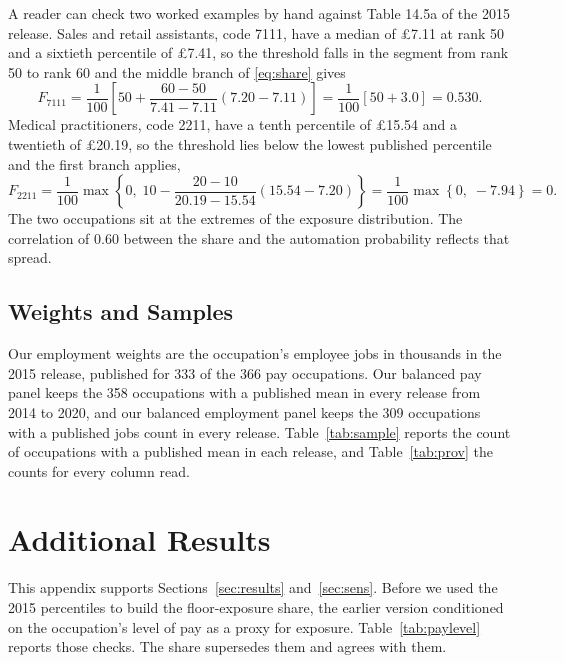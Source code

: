 \documentclass[12pt,leqno]{article}
\begin{document}
A reader can check two worked examples by hand against Table 14.5a of the 2015 release. Sales and retail assistants, code 7111, have a median of \pounds 7.11 at rank 50 and a sixtieth percentile of \pounds 7.41, so the threshold falls in the segment from rank 50 to rank 60 and the middle branch of \eqref{eq:share} gives
\begin{equation}
F_{7111} = \frac{1}{100}\left[50 + \frac{60 - 50}{7.41 - 7.11}\left(7.20 - 7.11\right)\right] = \frac{1}{100}\left[50 + 3.0\right] = 0.530 .
\end{equation}
Medical practitioners, code 2211, have a tenth percentile of \pounds 15.54 and a twentieth of \pounds 20.19, so the threshold lies below the lowest published percentile and the first branch applies,
\begin{equation}
F_{2211} = \frac{1}{100}\max\!\left\{0,\; 10 - \frac{20 - 10}{20.19 - 15.54}\left(15.54 - 7.20\right)\right\} = \frac{1}{100}\max\!\left\{0,\; -7.94\right\} = 0 .
\end{equation}
The two occupations sit at the extremes of the exposure distribution. The correlation of $0.60$ between the share and the automation probability reflects that spread.

\subsection{Weights and Samples}

Our employment weights are the occupation's employee jobs in thousands in the 2015 release, published for 333 of the 366 pay occupations. Our balanced pay panel keeps the 358 occupations with a published mean in every release from 2014 to 2020, and our balanced employment panel keeps the 309 occupations with a published jobs count in every release. Table~\ref{tab:sample} reports the count of occupations with a published mean in each release, and Table~\ref{tab:prov} the counts for every column read.

\section{Additional Results}\label{app:extra}

This appendix supports Sections~\ref{sec:results} and~\ref{sec:sens}. Before we used the 2015 percentiles to build the floor-exposure share, the earlier version conditioned on the occupation's level of pay as a proxy for exposure. Table~\ref{tab:paylevel} reports those checks. The share supersedes them and agrees with them.
\end{document}
